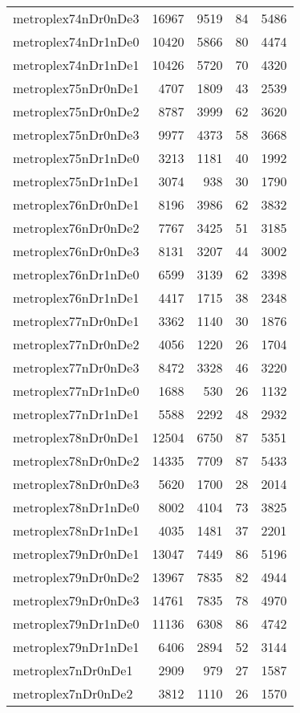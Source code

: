 \documentclass[../../../thesis.tex]{subfiles}
\begin{document}
\begin{longtable}{lrrrr}
metroplex74nDr0nDe3 & 16967 & 9519 & 84 & 5486 \\
metroplex74nDr1nDe0 & 10420 & 5866 & 80 & 4474 \\
metroplex74nDr1nDe1 & 10426 & 5720 & 70 & 4320 \\
metroplex75nDr0nDe1 & 4707 & 1809 & 43 & 2539 \\
metroplex75nDr0nDe2 & 8787 & 3999 & 62 & 3620 \\
metroplex75nDr0nDe3 & 9977 & 4373 & 58 & 3668 \\
metroplex75nDr1nDe0 & 3213 & 1181 & 40 & 1992 \\
metroplex75nDr1nDe1 & 3074 & 938 & 30 & 1790 \\
metroplex76nDr0nDe1 & 8196 & 3986 & 62 & 3832 \\
metroplex76nDr0nDe2 & 7767 & 3425 & 51 & 3185 \\
metroplex76nDr0nDe3 & 8131 & 3207 & 44 & 3002 \\
metroplex76nDr1nDe0 & 6599 & 3139 & 62 & 3398 \\
metroplex76nDr1nDe1 & 4417 & 1715 & 38 & 2348 \\
metroplex77nDr0nDe1 & 3362 & 1140 & 30 & 1876 \\
metroplex77nDr0nDe2 & 4056 & 1220 & 26 & 1704 \\
metroplex77nDr0nDe3 & 8472 & 3328 & 46 & 3220 \\
metroplex77nDr1nDe0 & 1688 & 530 & 26 & 1132 \\
metroplex77nDr1nDe1 & 5588 & 2292 & 48 & 2932 \\
metroplex78nDr0nDe1 & 12504 & 6750 & 87 & 5351 \\
metroplex78nDr0nDe2 & 14335 & 7709 & 87 & 5433 \\
metroplex78nDr0nDe3 & 5620 & 1700 & 28 & 2014 \\
metroplex78nDr1nDe0 & 8002 & 4104 & 73 & 3825 \\
metroplex78nDr1nDe1 & 4035 & 1481 & 37 & 2201 \\
metroplex79nDr0nDe1 & 13047 & 7449 & 86 & 5196 \\
metroplex79nDr0nDe2 & 13967 & 7835 & 82 & 4944 \\
metroplex79nDr0nDe3 & 14761 & 7835 & 78 & 4970 \\
metroplex79nDr1nDe0 & 11136 & 6308 & 86 & 4742 \\
metroplex79nDr1nDe1 & 6406 & 2894 & 52 & 3144 \\
metroplex7nDr0nDe1 & 2909 & 979 & 27 & 1587 \\
metroplex7nDr0nDe2 & 3812 & 1110 & 26 & 1570 \\

\end{longtable}
\end{document}
